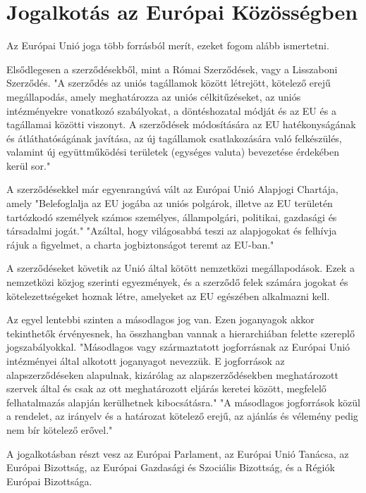 \section{Jogalkotás az Európai Közösségben}

Az Európai Unió joga több forrásból merít, ezeket fogom alább ismertetni. \cite{EU-jog}

Elsődlegesen a szerződésekből, mint a Római Szerződések, vagy a Lisszaboni Szerződés. "A szerződés az uniós tagállamok között létrejött, kötelező erejű megállapodás, amely meghatározza az uniós célkitűzéseket, az uniós intézményekre vonatkozó szabályokat, a döntéshozatal módját és az EU és a tagállamai közötti viszonyt. A szerződések módosítására az EU hatékonyságának és átláthatóságának javítása, az új tagállamok csatlakozására való felkészülés, valamint új együttműködési területek (egységes valuta) bevezetése érdekében kerül sor." \cite{EU-szerzodesek}

A szerződésekkel már egyenrangúvá vált az Európai Unió Alapjogi Chartája, amely "Belefoglalja az EU jogába az uniós polgárok, illetve az EU területén tartózkodó személyek számos személyes, állampolgári, politikai, gazdasági és társadalmi jogát." "Azáltal, hogy világosabbá teszi az alapjogokat és felhívja rájuk a figyelmet, a charta jogbiztonságot teremt az EU-ban." \cite{EU-charta}

A szerződéseket követik az Unió által kötött nemzetközi megállapodások. Ezek a nemzetközi közjog szerinti egyezmények, és a szerződő felek számára jogokat és kötelezettségeket hoznak létre, amelyeket az EU egészében alkalmazni kell. \cite{EU-nemzetkozi}

Az egyel lentebbi szinten a másodlagos jog van. Ezen joganyagok akkor tekinthetők érvényesnek, ha összhangban vannak a hierarchiában felette szereplő jogszabályokkal. "Másodlagos vagy származtatott jogforrásnak az Európai Unió intézményei által alkotott joganyagot nevezzük. E jogforrások az alapszerződéseken alapulnak, kizárólag az alapszerződésekben meghatározott szervek által és csak az ott meghatározott eljárás keretei között, megfelelő felhatalmazás alapján kerülhetnek kibocsátásra." "A másodlagos jogforrások közül a rendelet, az irányelv és a határozat kötelező erejű, az ajánlás és vélemény pedig nem bír kötelező erővel." \cite{EU-masodlagos}

A jogalkotásban részt vesz az Európai Parlament, az Európai Unió Tanácsa, az Európai Bizottság, az Európai Gazdasági és Szociális Bizottság, és a Régiók Európai Bizottsága.